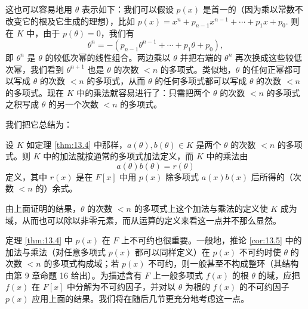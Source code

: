 这也可以容易地用 \(\theta\) 表示如下：我们可以假设 \(p(x)\) 是首一的（因为乘以常数不改变它的根及它生成的理想），比如 \(p(x) = x^n+p_{n-1}x^{n-1}+\cdots+p_1x+p_0\). 则在 \(K\) 中，由于 \(p(\theta) = 0\)，我们有
\[
\theta^n = -(p_{n-1}\theta^{n-1}+\cdots+p_1\theta+p_0),
\]
即 \(\theta^n\) 是 \(\theta\) 的较低次幂的线性组合。两边乘以 \(\theta\) 并把右端的 \(\theta^n\) 再次换成这些较低次幂，我们看到 \(\theta^{n+1}\) 也是 \(\theta\) 的次数 \(< n\) 的多项式。类似地，\(\theta\) 的任何正幂都可以写成 \(\theta\) 的次数 \(< n\) 的多项式，从而 \(\theta\) 的任何多项式都可以写成 \(\theta\) 的次数 \(< n\) 的多项式。现在 \(K\) 中的乘法就容易进行了：只需把两个 \(\theta\) 的次数 \(< n\) 的多项式之积写成 \(\theta\) 的另一个次数 \(< n\) 的多项式。

我们把它总结为：

\begin{corollary}\label{cor:13.5}
设 \(K\) 如定理 \ref{thm:13.4} 中那样，\(a(\theta), b(\theta) \in K\) 是两个 \(\theta\) 的次数 \(< n\) 的多项式。则 \(K\) 中的加法就按通常的多项式加法定义，而 \(K\) 中的乘法由
\[
a(\theta)b(\theta) = r(\theta)
\]
定义，其中 \(r(x)\) 是在 \(F[x]\) 中用 \(p(x)\) 除多项式 \(a(x)b(x)\) 后所得的（次数 \(< n\) 的）余式。
\end{corollary}

由上面证明的结果，\(\theta\) 的次数 \(< n\) 的多项式上这个加法与乘法的定义使 \(K\) 成为域，从而也可以除以非零元素，而从运算的定义来看这一点并不那么显然。

定理 \ref{thm:13.4} 中 \(p(x)\) 在 \(F\) 上不可约也很重要。一般地，推论 \ref{cor:13.5} 中的加法与乘法（对任意多项式 \(p(x)\) 都可以同样定义）在 \(p(x)\) 不可约时使 \(\theta\) 的次数 \(< n\) 的多项式构成域；若 \(p(x)\) 不可约，则一般甚至不构成整环（其结构由第 9 章命题 16 给出）。为描述含有 \(F\) 上一般多项式 \(f(x)\) 的根 \(\theta\) 的域，应把 \(f(x)\) 在 \(F[x]\) 中分解为不可约因子，并对以 \(\theta\) 为根的 \(f(x)\) 的不可约因子 \(p(x)\) 应用上面的结果。我们将在随后几节更充分地考虑这一点。

